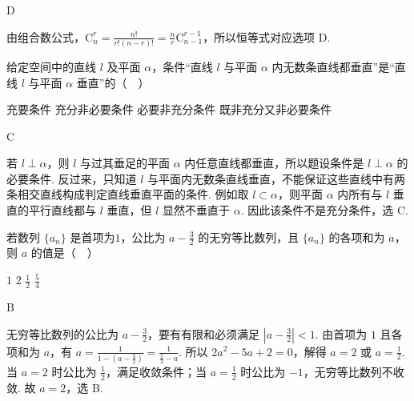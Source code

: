 \begin{answer}
D
\end{answer}

\begin{solution}
由组合数公式，\(\mathrm C_n^r=\frac{n!}{r!(n-r)!}=\frac{n}{r}\mathrm C_{n-1}^{r-1}\)，所以恒等式对应选项 D.
\end{solution}

\begin{problem}
给定空间中的直线 \(l\) 及平面 \(\alpha\)，条件“直线 \(l\) 与平面 \(\alpha\) 内无数条直线都垂直”是“直线 \(l\) 与平面 \(\alpha\) 垂直”的（\(\quad\)）

\choices
    {充要条件}
    {充分非必要条件}
    {必要非充分条件}
    {既非充分又非必要条件}
\end{problem}

\begin{answer}
C
\end{answer}

\begin{solution}
若 \(l\perp\alpha\)，则 \(l\) 与过其垂足的平面 \(\alpha\) 内任意直线都垂直，所以题设条件是 \(l\perp\alpha\) 的必要条件. 反过来，只知道 \(l\) 与平面内无数条直线垂直，不能保证这些直线中有两条相交直线构成判定直线垂直平面的条件. 例如取 \(l\subset\alpha\)，则平面 \(\alpha\) 内所有与 \(l\) 垂直的平行直线都与 \(l\) 垂直，但 \(l\) 显然不垂直于 \(\alpha\). 因此该条件不是充分条件，选 C.
\end{solution}

\begin{problem}
若数列 \(\{a_{n}\}\) 是首项为\(1\)，公比为 \(a - \frac{3}{2}\) 的无穷等比数列，且 \(\{a_{n}\}\) 的各项和为 \(a\)，则 \(a\) 的值是（\(\quad\)）

\choices
    {\(1\)}
    {\(2\)}
    {\( \frac{1}{2} \)}
    {\( \frac{5}{4} \)}
\end{problem}

\begin{answer}
B
\end{answer}

\begin{solution}
无穷等比数列的公比为 \(a-\frac32\)，要有有限和必须满足 \(\left|a-\frac32\right|<1\). 由首项为 \(1\) 且各项和为 \(a\)，有 \(a=\frac{1}{1-\left(a-\frac32\right)}=\frac{1}{\frac52-a}\). 所以 \(2a^2-5a+2=0\)，解得 \(a=2\) 或 \(a=\frac12\). 当 \(a=2\) 时公比为 \(\frac12\)，满足收敛条件；当 \(a=\frac12\) 时公比为 \(-1\)，无穷等比数列不收敛. 故 \(a=2\)，选 B.
\end{solution}

